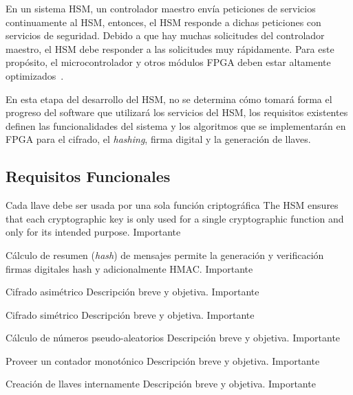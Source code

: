 \documentclass[a4paper]{article}
\begin{document}
En un sistema HSM, un controlador maestro envía peticiones de servicios continuamente al HSM, entonces, el HSM responde a dichas peticiones con servicios de seguridad. Debido a que hay muchas solicitudes del controlador maestro, el HSM debe responder a las solicitudes muy rápidamente. Para este propósito, el microcontrolador y otros módulos FPGA deben estar altamente optimizados~\cite{evita-hsm:2012}. 

En esta etapa del desarrollo del HSM, no se determina cómo tomará forma el progreso del software que utilizará los servicios del HSM, los requisitos existentes definen las funcionalidades del sistema y los algoritmos que se implementarán en FPGA para el cifrado, el \textit{hashing}, firma digital y la generación de llaves.

    \subsection{Requisitos Funcionales}
    \begin{functional}
          {Cada llave debe ser usada por una sola función criptográfica}
      {The HSM ensures that each cryptographic key is only used for a single cryptographic function and only for its intended purpose.}
      {Importante}
    
      {Cálculo de resumen (\textit{hash}) de mensajes}
      {permite la generación y verificación firmas digitales hash y adicionalmente HMAC.}
      {Importante}
            
      {Cifrado asimétrico}
      {Descripción breve y objetiva.}
      {Importante}
            
      {Cifrado simétrico}
      {Descripción breve y objetiva.}
      {Importante}
            
      {Cálculo de números pseudo-aleatorios}
      {Descripción breve y objetiva.}
      {Importante}
            
            {Proveer un contador monotónico}
            {Descripción breve y objetiva.}
            {Importante}
            
            {Creación de llaves internamente}
            {Descripción breve y objetiva.}
            {Importante}
            
    \end{functional}
\end{document}
